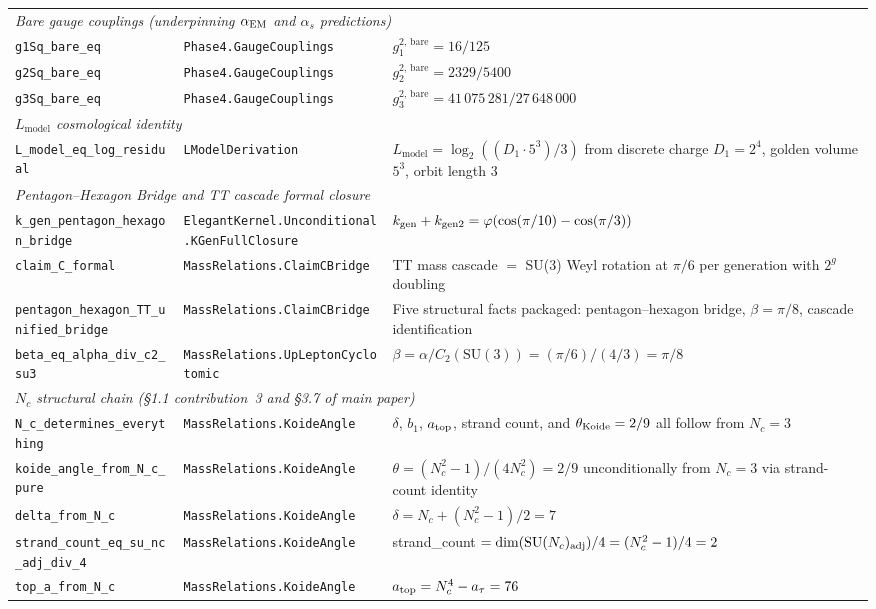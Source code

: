 \documentclass[10pt]{article}
\begin{document}
\begin{longtable}{@{} p{3.8cm} p{4.8cm} p{4.8cm} @{}}
\multicolumn{3}{l}{\textit{Bare gauge couplings (underpinning $\alpha_{\rm EM}$ and $\alpha_s$ predictions)}} \\[2pt]
\nolinkurl{g1Sq_bare_eq} & \nolinkurl{Phase4.GaugeCouplings} & $g_1^{2,\,\mathrm{bare}} = 16/125$ \\
\nolinkurl{g2Sq_bare_eq} & \nolinkurl{Phase4.GaugeCouplings} & $g_2^{2,\,\mathrm{bare}} = 2329/5400$ \\
\nolinkurl{g3Sq_bare_eq} & \nolinkurl{Phase4.GaugeCouplings} & $g_3^{2,\,\mathrm{bare}} = 41\,075\,281/27\,648\,000$ \\[4pt]

\multicolumn{3}{l}{\textit{$L_{\mathrm{model}}$ cosmological identity}} \\[2pt]
\nolinkurl{L_model_eq_log_residual} & \nolinkurl{LModelDerivation} & $L_{\mathrm{model}} = \log_2((D_1 \cdot 5^3)/3)$ from discrete charge $D_1 = 2^4$, golden volume $5^3$, orbit length 3 \\[4pt]

\multicolumn{3}{l}{\textit{Pentagon--Hexagon Bridge and TT cascade formal closure}} \\[2pt]
\nolinkurl{k_gen_pentagon_hexagon_bridge} & \nolinkurl{ElegantKernel.Unconditional.KGenFullClosure} & $k_{\rm gen} + k_{\rm gen2} = \varphi(\cos(\pi/10) - \cos(\pi/3))$ \\
\nolinkurl{claim_C_formal} & \nolinkurl{MassRelations.ClaimCBridge} & TT mass cascade $=$ SU(3) Weyl rotation at $\pi/6$ per generation with $2^g$ doubling \\
\nolinkurl{pentagon_hexagon_TT_unified_bridge} & \nolinkurl{MassRelations.ClaimCBridge} & Five structural facts packaged: pentagon--hexagon bridge, $\beta = \pi/8$, cascade identification \\
\nolinkurl{beta_eq_alpha_div_c2_su3} & \nolinkurl{MassRelations.UpLeptonCyclotomic} & $\beta = \alpha/C_2(\mathrm{SU}(3)) = (\pi/6)/(4/3) = \pi/8$ \\[4pt]

\multicolumn{3}{l}{\textit{$N_c$ structural chain (\S1.1 contribution~3 and \S3.7 of main paper)}} \\[2pt]
\nolinkurl{N_c_determines_everything} & \nolinkurl{MassRelations.KoideAngle} & $\delta$, $b_1$, $a_{\rm top}$, strand count, and $\theta_{\rm Koide} = 2/9$ all follow from $N_c = 3$ \\
\nolinkurl{koide_angle_from_N_c_pure} & \nolinkurl{MassRelations.KoideAngle} & $\theta = (N_c^2-1)/(4N_c^2) = 2/9$ unconditionally from $N_c = 3$ via strand-count identity \\
\nolinkurl{delta_from_N_c} & \nolinkurl{MassRelations.KoideAngle} & $\delta = N_c + (N_c^2-1)/2 = 7$ \\
\nolinkurl{strand_count_eq_su_nc_adj_div_4} & \nolinkurl{MassRelations.KoideAngle} & strand\_count $= \dim(\mathrm{SU}(N_c)_{\rm adj})/4 = (N_c^2-1)/4 = 2$ \\
\nolinkurl{top_a_from_N_c} & \nolinkurl{MassRelations.KoideAngle} & $a_{\rm top} = N_c^4 - a_\tau = 76$ \\[4pt]


\end{longtable}
\end{document}

